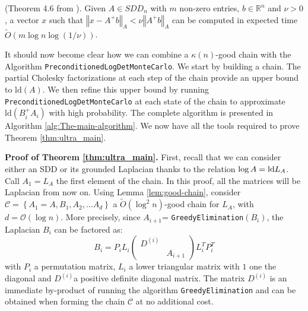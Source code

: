 \begin{lemma} \label{lem:linear-precond-existence}(Theorem 4.6 from
\cite{Koutis2011}). Given $A\in SDD_{n}$ with $m$ non-zero entries,
$b\in\mathbb{R}^{n}$ and $\nu>0$, a vector $x$ such that $\left\Vert x-A^{+}b\right\Vert _{A}<\nu\left\Vert A^{+}b\right\Vert _{A}$
can be computed in expected time $\tilde{O}\left(m\log n\log\left(1/\nu\right)\right)$.\end{lemma}

It should now become clear how we can combine a $\kappa\left(n\right)$-good
chain with the Algorithm \texttt{PreconditionedLogDetMonteCarlo}.
We start by building a chain. The partial Cholesky factorizations
at each step of the chain provide an upper bound to $\mbox{ld}\left(A\right)$.
We then refine this upper bound by running \texttt{PreconditionedLogDetMonteCarlo}
at each state of the chain to approximate $\mbox{ld}\left(B_{i}^{+}A_{i}\right)$
with high probability. The complete algorithm is presented in Algorithm
\ref{alg:The-main-algorithm}. We now have all the tools required
to prove Theorem \ref{thm:ultra_main}.

\textbf{Proof of Theorem \ref{thm:ultra_main}.} First, recall that
we can consider either an SDD or its grounded Laplacian thanks to
the relation $\log A=\text{\textnormal{ld}} L_{A}$. Call $A_{1}=L_{A}$ the first element
of the chain. In this proof, all the matrices will be Laplacian from
now on. Using Lemma \ref{lem:good-chain}, consider $\mathcal{C}=\left\{ A_{1}=A,B_{1},A_{2},\dots A_{d}\right\} $
a $\tilde{O}\left(\log^{2}n\right)$-good chain for $L_{A}$, with
$d=\mathcal{O}\left(\log n\right)$. More precisely, since $A_{i+1}$=
\texttt{GreedyElimination}$\left(B_{i}\right)$, the Laplacian $B_{i}$
can be factored as:
\[
B_{i}=P_{i}L_{i}\left(\begin{array}{cc}
D^{\left(i\right)}\\
 & A_{i+1}
\end{array}\right)L_{i}^{T}P_{i}^{T}
\]
with $P_{i}$ a permutation matrix, $L_{i}$ a lower triangular matrix
with $1$ one the diagonal and $D^{\left(i\right)}$a positive definite
diagonal matrix. The matrix $D^{\left(i\right)}$ is an immediate
by-product of running the algorithm \texttt{GreedyElimination} and
can be obtained when forming the chain $\mathcal{C}$ at no additional
cost.

